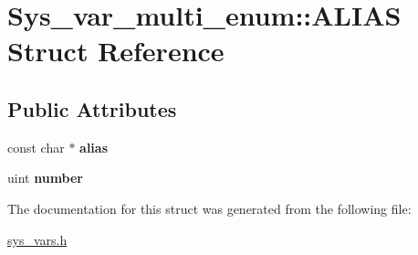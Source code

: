 \hypertarget{structSys__var__multi__enum_1_1ALIAS}{}\section{Sys\+\_\+var\+\_\+multi\+\_\+enum\+:\+:A\+L\+I\+AS Struct Reference}
\label{structSys__var__multi__enum_1_1ALIAS}
\subsection*{Public Attributes}
\begin{DoxyCompactItemize}
\item 
\mbox{\label{structSys__var__multi__enum_1_1ALIAS_aac47482cd6455ef9ad0367e89ba7d2ba}} 
const char $\ast$ {\bfseries alias}
\item 
\mbox{\label{structSys__var__multi__enum_1_1ALIAS_a6d06eef75ae8890ae51acda2106c4795}} 
uint {\bfseries number}
\end{DoxyCompactItemize}


The documentation for this struct was generated from the following file\+:\begin{DoxyCompactItemize}
\item 
\mbox{\hyperlink{sys__vars_8h}{sys\+\_\+vars.\+h}}\end{DoxyCompactItemize}
